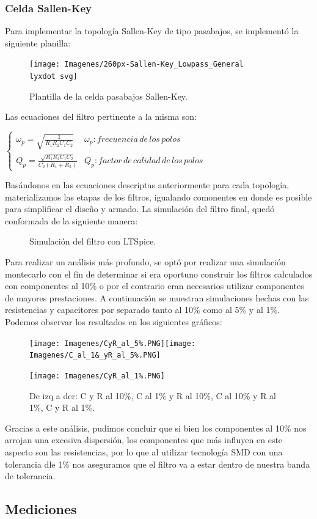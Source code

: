\documentclass[../../ASSD_TP1_G7.tex]{subfiles}
\begin{document}
\subsubsection{Celda Sallen-Key}

Para implementar la topología Sallen-Key de tipo pasabajos, se implementó
la siguiente planilla:

\begin{figure}[H]
\centering{}\texttt{[image: Imagenes/260px-Sallen-Key\_Lowpass\_General\\lyxdot svg]}\caption{Plantilla de la celda pasabajos Sallen-Key.}
\end{figure}

Las ecuaciones del filtro pertinente a la misma son:

$\begin{cases}
\omega_{p}=\sqrt{\frac{1}{R_{1}R_{2}C_{1}C_{2}}} & \omega_{p}:frecuencia\,de\,los\,polos\\
Q_{p}=\frac{\sqrt{R_{1}R_{2}C_{1}C_{2}}}{C_{2}(R_{1}+R_{2})} & Q_{p}:factor\,de\,calidad\,de\,los\,polos
\end{cases}$

Basándonos en las ecuaciones descriptas anteriormente para cada topología,
materializamos las etapas de los filtros, igualando comonentes en
donde es posible para simplificar el diseño y armado. La simulación
del filtro final, quedó conformada de la siguiente manera:

\begin{figure}[H]

\caption{Simulación del filtro con LTSpice.}

\end{figure}

Para realizar un análisis más profundo, se optó por realizar una simulación
montecarlo con el fin de determinar si era oportuno construir los
filtros calculados con componentes al 10\% o por el contrario eran
necesarios utilizar componentes de mayores prestaciones. A continuación
se muestran simulaciones hechas con las resistencias y capacitores
por separado tanto al 10\% como al 5\% y al 1\%. Podemos observar
los resultados en los siguientes gráficos:

\begin{figure}[H]
\texttt{[image: Imagenes/CyR\_al\_5\%.PNG]}\texttt{[image: Imagenes/C\_al\_1\&\_yR\_al\_5\%.PNG]}
\begin{centering}
\texttt{[image: Imagenes/CyR\_al\_1\%.PNG]}\caption{De izq a der: C y R al 10\%, C al 1\% y R al 10\%, C al 10\% y R al
1\%, C y R al 1\%.}
\par\end{centering}
\end{figure}


Gracias a este análisis, pudimos concluir que si bien los componentes
al 10\% nos arrojan una excesiva dispersión, los componentes que más
influyen en este aspecto son las resistencias, por lo que al utilizar
tecnología SMD con una tolerancia dle 1\% nos aseguramos que el filtro
va a estar dentro de nuestra banda de tolerancia.

\subsection{Mediciones}
\end{document}
